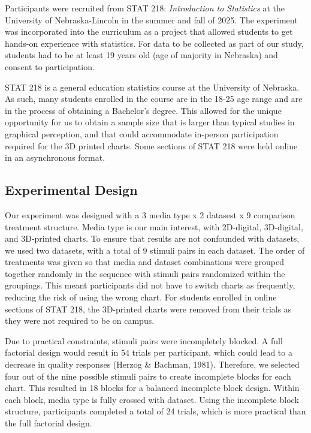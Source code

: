 \documentclass[phd]{nuthesis}
\begin{document}
Participants were recruited from STAT 218: \emph{Introduction to
Statistics} at the University of Nebraska-Lincoln in the summer and fall
of 2025. The experiment was incorporated into the curriculum as a
project that allowed students to get hands-on experience with
statistics. For data to be collected as part of our study, students had
to be at least 19 years old (age of majority in Nebraska) and consent to
participation.

STAT 218 is a general education statistics course at the University of
Nebraska. As such, many students enrolled in the course are in the 18-25
age range and are in the process of obtaining a Bachelor's degree. This
allowed for the unique opportunity for us to obtain a sample size that
is larger than typical studies in graphical perception, and that could
accommodate in-person participation required for the 3D printed charts.
Some sections of STAT 218 were held online in an asynchronous format.

\subsection{Experimental Design}\label{experimental-design-1}

Our experiment was designed with a 3 media type x 2 datasest x 9
comparison treatment structure. Media type is our main interest, with
2D-digital, 3D-digital, and 3D-printed charts. To ensure that results
are not confounded with datasets, we used two datasets, with a total of
9 stimuli pairs in each dataset. The order of treatments was given so
that media and dataset combinations were grouped together randomly in
the sequence with stimuli pairs randomized within the groupings. This
meant participants did not have to switch charts as frequently, reducing
the risk of using the wrong chart. For students enrolled in online
sections of STAT 218, the 3D-printed charts were removed from their
trials as they were not required to be on campus.

Due to practical constraints, stimuli pairs were incompletely blocked. A
full factorial design would result in 54 trials per participant, which
could lead to a decrease in quality responses (Herzog \& Bachman, 1981).
Therefore, we selected four out of the nine possible stimuli pairs to
create incomplete blocks for each chart. This resulted in 18 blocks for
a balanced incomplete block design. Within each block, media type is
fully crossed with dataset. Using the incomplete block structure,
participants completed a total of 24 trials, which is more practical
than the full factorial design.
\end{document}
